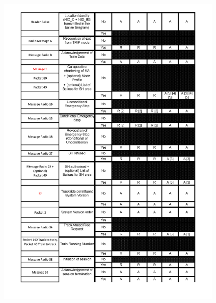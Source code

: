\documentclass{template/openetcs_report}
\begin{document}
\begin{figure}[hbtp]
\centering
\includegraphics [scale=0.6]{images/LevelFilter3}
\end{figure}
\end{document}

